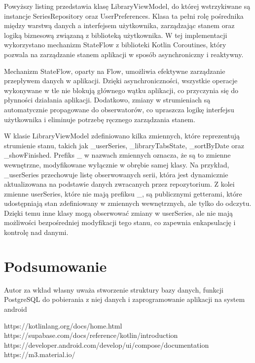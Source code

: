 \documentclass[12pt,twoside]{article}
\begin{document}
Powyższy listing przedstawia klasę LibraryViewModel, do której wstrzykiwane są instancje SeriesRepository oraz 
UserPreferences. Klasa ta pełni rolę pośrednika między warstwą danych a interfejsem użytkownika, zarządzając 
stanem oraz logiką biznesową związaną z biblioteką użytkownika. W tej implementacji wykorzystano mechanizm 
StateFlow z biblioteki Kotlin Coroutines, który pozwala na zarządzanie stanem aplikacji w sposób asynchroniczny 
i reaktywny.

Mechanizm StateFlow, oparty na Flow, umożliwia efektywne zarządzanie przepływem danych w aplikacji. Dzięki 
asynchroniczności, wszystkie operacje wykonywane w tle nie blokują głównego wątku aplikacji, co przyczynia się 
do płynności działania aplikacji. Dodatkowo, zmiany w strumieniach są automatycznie propagowane do obserwatorów, 
co upraszcza logikę interfejsu użytkownika i eliminuje potrzebę ręcznego zarządzania stanem.

W klasie LibraryViewModel zdefiniowano kilka zmiennych, które reprezentują strumienie stanu, takich jak 
\_userSeries, \_libraryTabsState, \_sortByDate oraz \_showFinished. Prefiks \_ w nazwach zmiennych oznacza, że 
są to zmienne wewnętrzne, modyfikowane wyłącznie w obrębie samej klasy. Na przykład, \_userSeries przechowuje 
listę obserwowanych serii, która jest dynamicznie aktualizowana na podstawie danych zwracanych przez 
repozytorium. Z kolei zmienne userSeries, które nie mają prefiksu \_, są publicznymi getterami, które 
udostępniają stan zdefiniowany w zmiennych wewnętrznych, ale tylko do odczytu. Dzięki temu inne klasy mogą 
obserwować zmiany w userSeries, ale nie mają możliwości bezpośredniej modyfikacji tego stanu, co zapewnia 
enkapsulację i kontrolę nad danymi.

\clearpage

\section{Podsumowanie}

Autor za wkład własny uważa stworzenie struktury bazy danych, funkcji PostgreSQL do pobierania z niej danych i 
zaprogramowanie aplikacji na system android 

\clearpage


\begin{thebibliography}{4}
	\bibitem{} https://kotlinlang.org/docs/home.html
	\bibitem{} https://supabase.com/docs/reference/kotlin/introduction
	\bibitem{} https://developer.android.com/develop/ui/compose/documentation
	\bibitem{} https://m3.material.io/
\end{thebibliography}

\clearpage

\makesummary
\end{document}
